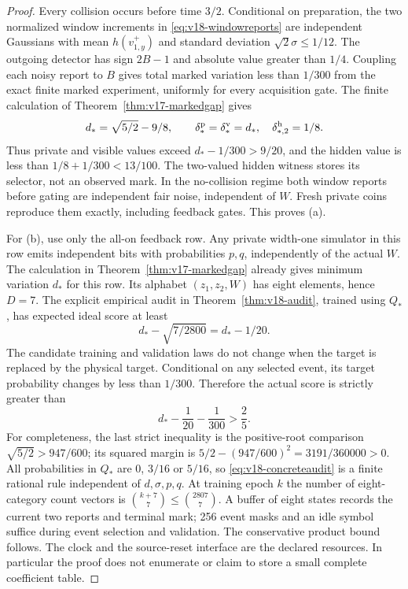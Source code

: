 \begin{proof}
Every collision occurs before time $3/2$. Conditional on preparation, the
two normalized window increments in \eqref{eq:v18-windowreports} are
independent Gaussians with mean $h(v_{1,y}^+)$ and standard deviation
$\sqrt2\sigma\le1/12$. The outgoing detector has sign $2B-1$ and absolute
value greater than $1/4$. Coupling each noisy report to $B$ gives total
marked variation less than $1/300$ from the exact finite marked experiment,
uniformly for every acquisition gate. The finite calculation of
Theorem~\ref{thm:v17-markedgap} gives
\[
 d_* =\sqrt{5/2}-9/8,\qquad
 \delta_*^{\rm p}=\delta_*^{\rm v}=d_*,\quad
 \delta_{*,2}^{\rm h}=1/8.
\]
Thus private and visible values exceed $d_*-1/300>9/20$, and the hidden
value is less than $1/8+1/300<13/100$. The two-valued hidden witness stores
its selector, not an observed mark. In the no-collision regime both window
reports before gating are independent fair noise, independent of $W$.
Fresh private coins reproduce them exactly, including feedback gates.
This proves (a).

For (b), use only the all-on feedback row. Any private width-one simulator
in this row emits independent bits with probabilities $p,q$, independently
of the actual $W$. The calculation in
Theorem~\ref{thm:v17-markedgap} already gives minimum variation $d_*$ for
this row. Its alphabet $(z_1,z_2,W)$ has eight elements, hence $D=7$.
The explicit empirical audit in Theorem~\ref{thm:v18-audit}, trained using
$Q_*$, has expected ideal score at least
\[
 d_*-\sqrt{7/2800}=d_*-1/20.
\]
The candidate training and validation laws do not change when the target
is replaced by the physical target. Conditional on any selected event,
its target probability changes by less than $1/300$. Therefore the actual
score is strictly greater than
\begin{equation}\label{eq:v18-uniformcertificate}
 d_*-\frac1{20}-\frac1{300}>\frac25.
\end{equation}
For completeness, the last strict inequality is the positive-root
comparison
$\sqrt{5/2}>947/600$; its squared margin is
$5/2-(947/600)^2=3191/360000>0$.
All probabilities in $Q_*$ are $0$, $3/16$ or $5/16$, so
\eqref{eq:v18-concreteaudit} is a finite rational rule independent of
$d,\sigma,p,q$. At training epoch $k$ the number of eight-category count
vectors is $\binom{k+7}{7}\le\binom{2807}{7}$. A buffer of eight states
records the current two reports and terminal mark; 256 event masks and
an idle symbol suffice during event selection and validation. The
conservative product bound follows. The clock and the source-reset
interface are the declared resources. In particular the proof does not
enumerate or claim to store a small complete coefficient table.


\end{proof}
